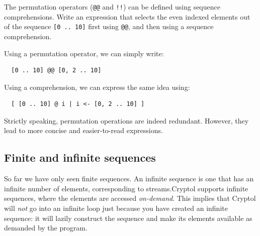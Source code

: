 \begin{Exercise}\label{ex:seq:8}
  The permutation operators ({\tt @@} and {\tt !!}) can be defined
  using sequence comprehensions.  Write an expression that selects the
  even indexed elements out of the sequence {\tt [0 .. 10]} first
  using {\tt @@}, and then using a sequence comprehension.
\end{Exercise}
\begin{Answer}
Using a permutation operator, we can simply write:
\begin{Verbatim}
  [0 .. 10] @@ [0, 2 .. 10]
\end{Verbatim}
Using a comprehension, we can express the same idea using:
\begin{Verbatim}
  [ [0 .. 10] @ i | i <- [0, 2 .. 10] ]
\end{Verbatim}
Strictly speaking, permutation operations are indeed redundant. 
However, they lead to more concise and easier-to-read expressions.
\end{Answer}

\subsection{Finite and infinite sequences}\indFiniteSeq\indInfSeq
\label{sec:finite-infin-sequ}

So far we have only seen finite sequences.  An infinite sequence is one
that has an infinite number of elements, corresponding to
streams.\indStream  Cryptol supports infinite sequences, where the
elements are accessed {\em on-demand}.  This implies that Cryptol will
{\em not} go into an infinite loop just because you have created an
infinite sequence: it will lazily construct the sequence and make its
elements available as demanded by the program.

